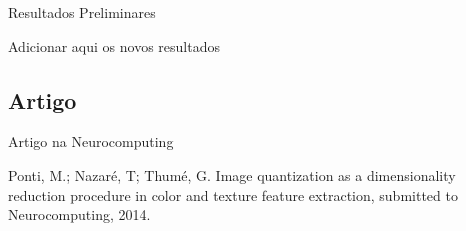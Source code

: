 \documentclass{beamer}
\begin{document}
\begin{frame}{Resultados Preliminares} %


Adicionar aqui os novos resultados

\end{frame}
\subsection{Artigo}
\begin{frame}{Artigo na Neurocomputing}
\begin{block}{}
\justifying
Ponti, M.; Nazaré, T; Thumé, G. Image quantization as a dimensionality reduction procedure in color and texture feature extraction, submitted to Neurocomputing, 2014.
\end{block}
\end{frame}
\end{document}
